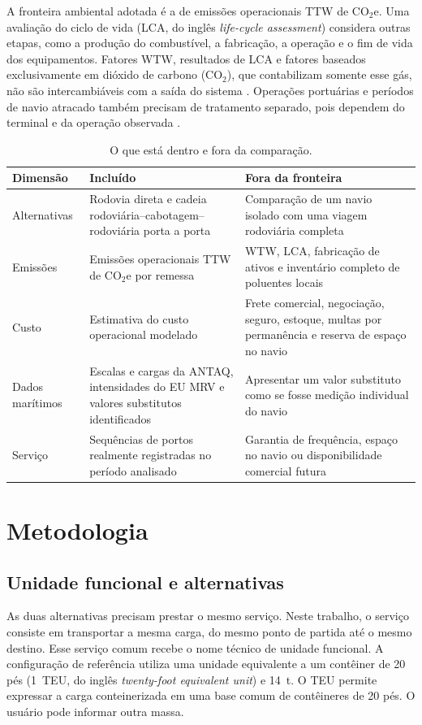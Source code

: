 \documentclass[12pt,a4paper]{article}
\newcommand{\cooe}{CO$_2$e}
\newcommand{\ttw}{TTW}
\newcommand{\wtw}{WTW}
\begin{document}
A fronteira ambiental adotada é a de emissões operacionais \ttw{} de \cooe{}. Uma avaliação do ciclo de vida (LCA, do inglês \emph{life-cycle assessment}) considera outras etapas, como a produção do combustível, a fabricação, a operação e o fim de vida dos equipamentos. Fatores \wtw{}, resultados de LCA e fatores baseados exclusivamente em dióxido de carbono (CO$_2$), que contabilizam somente esse gás, não são intercambiáveis com a saída do sistema \cite{decarb2024,maritimelca2024}. Operações portuárias e períodos de navio atracado também precisam de tratamento separado, pois dependem do terminal e da operação observada \cite{berth2009,berthairquality2010,shipops2022}.

\begin{table}[htbp]
\centering
\small
\caption{O que está dentro e fora da comparação.}
\label{tab:fronteiras}
\begin{tabular}{p{}p{}p{}}
\toprule
Dimensão & Incluído & Fora da fronteira \tabularnewline
\midrule
Alternativas & Rodovia direta e cadeia rodoviária--cabotagem--rodoviária porta a porta & Comparação de um navio isolado com uma viagem rodoviária completa \tabularnewline
Emissões & Emissões operacionais \ttw{} de \cooe{} por remessa & \wtw{}, LCA, fabricação de ativos e inventário completo de poluentes locais \tabularnewline
Custo & Estimativa do custo operacional modelado & Frete comercial, negociação, seguro, estoque, multas por permanência e reserva de espaço no navio \tabularnewline
Dados marítimos & Escalas e cargas da ANTAQ, intensidades do EU MRV e valores substitutos identificados & Apresentar um valor substituto como se fosse medição individual do navio \tabularnewline
Serviço & Sequências de portos realmente registradas no período analisado & Garantia de frequência, espaço no navio ou disponibilidade comercial futura \tabularnewline
\bottomrule
\end{tabular}
\end{table}

\section{Metodologia}
\label{sec:metodologia}

\subsection{Unidade funcional e alternativas}
\label{subsec:unidade-funcional}

As duas alternativas precisam prestar o mesmo serviço. Neste trabalho, o serviço consiste em transportar a mesma carga, do mesmo ponto de partida até o mesmo destino. Esse serviço comum recebe o nome técnico de unidade funcional. A configuração de referência utiliza uma unidade equivalente a um contêiner de 20 pés (1~TEU, do inglês \emph{twenty-foot equivalent unit}) e 14~t. O TEU permite expressar a carga conteinerizada em uma base comum de contêineres de 20 pés. O usuário pode informar outra massa.
\end{document}

